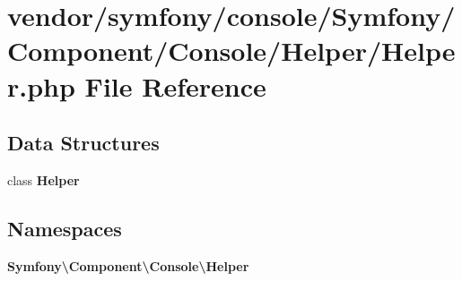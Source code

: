 \section{vendor/symfony/console/\+Symfony/\+Component/\+Console/\+Helper/\+Helper.php File Reference}
\label{_helper_8php}
\subsection*{Data Structures}
\begin{DoxyCompactItemize}
\item 
class {\bf Helper}
\end{DoxyCompactItemize}
\subsection*{Namespaces}
\begin{DoxyCompactItemize}
\item 
 {\bf Symfony\textbackslash{}\+Component\textbackslash{}\+Console\textbackslash{}\+Helper}
\end{DoxyCompactItemize}
